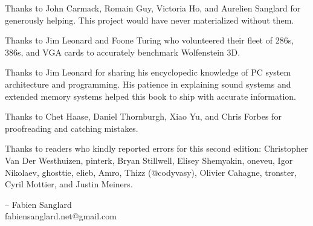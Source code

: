 Thanks to John Carmack, Romain Guy, Victoria Ho, and Aurelien Sanglard for generously helping. This project would have never
materialized without them.\\ 
\par
Thanks to  Jim Leonard and Foone Turing who volunteered their fleet of 286s, 386s, and VGA cards to accurately benchmark Wolfenstein 3D.\\
\par
Thanks to  Jim Leonard for sharing his encyclopedic knowledge of PC system architecture and programming. His patience in explaining sound systems and extended memory systems helped this book to ship with accurate information.\\
\par
Thanks to  Chet Haase, Daniel Thornburgh, Xiao Yu, and Chris Forbes for proofreading and catching mistakes.\\
\par
Thanks to readers who kindly reported errors for this second edition: Christopher Van Der Westhuizen, pinterk, Bryan Stillwell, Elisey Shemyakin, oneveu, Igor Nikolaev, ghosttie, elieb, Amro, Thizz (@codyvasy), Olivier Cahagne, tronster, Cyril Mottier, and Justin Meiners.\\
\par
-- Fabien Sanglard\\
fabiensanglard.net@gmail.com
